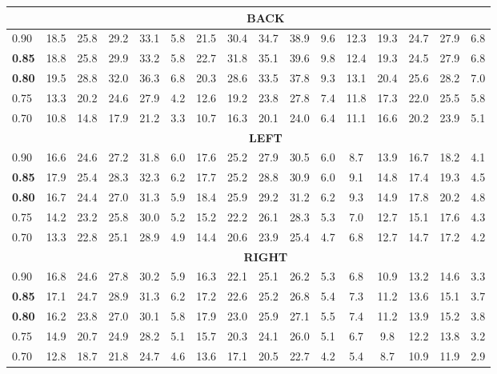 \documentclass[preprint,12pt]{elsarticle}
\begin{document}
\begin{landscape}
\begin{table}[H]
\begin{tabular}{l|ccccc|ccccc|ccccc}
		\hline
		& \multicolumn{5}{c}{} &\multicolumn{5}{c}{\bf BACK} &\multicolumn{5}{c}{}\\ \cline{2-16}		
		\hline
		0.90 &18.5&25.8&29.2&33.1&5.8&21.5&30.4&34.7&38.9&9.6&12.3&19.3&24.7&27.9&6.8\\[0.4ex] 
	\bf	0.85 &18.8&25.8&29.9&33.2&5.8&22.7&31.8&35.1&39.6&9.8&12.4&19.3&24.5&27.9&6.8\\[0.4ex]
	\bf	0.80 &19.5&28.8&32.0&36.3&6.8&20.3&28.6&33.5&37.8&9.3&13.1&20.4&25.6&28.2&7.0 \\[0.4ex]
		0.75 &13.3&20.2&24.6&27.9&4.2&12.6&19.2&23.8&27.8&7.4&11.8&17.3&22.0&25.5&5.8\\[0.4ex]
		0.70 &10.8&14.8&17.9&21.2&3.3&10.7&16.3&20.1&24.0&6.4&11.1&16.6&20.2&23.9&5.1 \\[0.4ex]
		\hline
		& \multicolumn{5}{c}{} &\multicolumn{5}{c}{\bf LEFT} &\multicolumn{5}{c}{}\\ \cline{2-16}		
		\hline
		0.90&16.6&24.6&27.2&31.8&6.0&17.6&25.2&27.9&30.5&6.0&8.7&13.9&16.7&18.2&4.1\\[0.4ex]
	\bf	0.85&17.9&25.4&28.3&32.3&6.2&17.7&25.2&28.8&30.9&6.0&9.1&14.8&17.4&19.3&4.5\\[0.4ex]
	\bf	0.80&16.7&24.4&27.0&31.3&5.9&18.4&25.9&29.2&31.2&6.2&9.3&14.9&17.8&20.2&4.8\\[0.4ex]
		0.75&14.2&23.2&25.8&30.0&5.2&15.2&22.2&26.1&28.3&5.3&7.0&12.7&15.1&17.6&4.3\\[0.4ex]
		0.70&13.3&22.8&25.1&28.9&4.9&14.4&20.6&23.9&25.4&4.7&6.8&12.7&14.7&17.2&4.2\\[0.4ex]
		\hline
		& \multicolumn{5}{c}{} &\multicolumn{5}{c}{\bf RIGHT} &\multicolumn{5}{c}{}\\ \cline{2-16}
		\hline
		0.90&16.8&24.6&27.8&30.2&5.9&16.3&22.1&25.1&26.2&5.3&6.8&10.9&13.2&14.6&3.3 \\[0.4ex]
	\bf	0.85&17.1&24.7&28.9&31.3&6.2&17.2&22.6&25.2&26.8&5.4&7.3&11.2&13.6&15.1&3.7 \\[0.4ex]
	\bf 0.80&16.2&23.8&27.0&30.1&5.8&17.9&23.0&25.9&27.1&5.5&7.4&11.2&13.9&15.2&3.8 \\[0.4ex]
		0.75&14.9&20.7&24.9&28.2&5.1&15.7&20.3&24.1&26.0&5.1&6.7&9.8&12.2&13.8&3.2 \\[0.4ex]
		0.70&12.8&18.7&21.8&24.7&4.6&13.6&17.1&20.5&22.7&4.2&5.4&8.7&10.9&11.9&2.9 \\[0.4ex]
		\hline 
	\end{tabular} 
\end{table}



\end{landscape}
\end{document}
